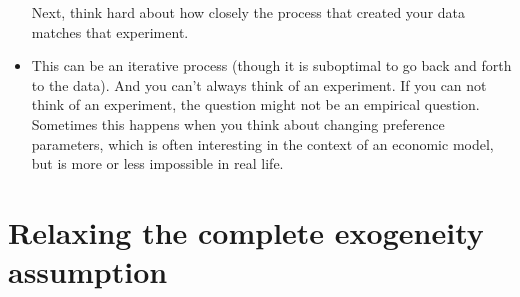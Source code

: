 \begin{itemize}[leftmargin=0pt]
  Next, think hard about how closely the process that created your
  data matches that experiment.

\item This can be an iterative process (though it is suboptimal to go
  back and forth to the data).  And you can't always think of an
  experiment.  If you can not think of an experiment, the question
  might not be an empirical question.  Sometimes this happens when you
  think about changing preference parameters, which is often
  interesting in the context of an economic model, but is more or less
  impossible in real life.

\end{itemize}

\section{Relaxing the complete exogeneity assumption}

